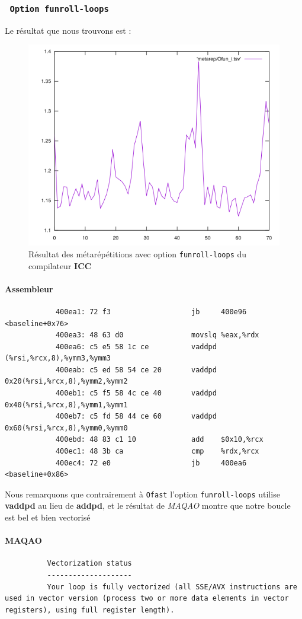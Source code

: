 \documentclass{report}
\begin{document}
      \subsubsection{\texttt{ Option funroll-loops}}
        Le résultat que nous trouvons est :
        \begin{figure}[ht!]
          \centering
          \includegraphics[scale=0.45]{resources/L1/metarep/Ofun_i.png}
          \caption{Résultat des métarépétitions avec option \texttt{funroll-loops} du compilateur \textbf{ICC}}
        \end{figure}
        \paragraph{Assembleur}
          \begin{verbatim}
            400ea1:	72 f3                	jb     400e96 <baseline+0x76>
            400ea3:	48 63 d0             	movslq %eax,%rdx
            400ea6:	c5 e5 58 1c ce       	vaddpd (%rsi,%rcx,8),%ymm3,%ymm3
            400eab:	c5 ed 58 54 ce 20    	vaddpd 0x20(%rsi,%rcx,8),%ymm2,%ymm2
            400eb1:	c5 f5 58 4c ce 40    	vaddpd 0x40(%rsi,%rcx,8),%ymm1,%ymm1
            400eb7:	c5 fd 58 44 ce 60    	vaddpd 0x60(%rsi,%rcx,8),%ymm0,%ymm0
            400ebd:	48 83 c1 10          	add    $0x10,%rcx
            400ec1:	48 3b ca             	cmp    %rdx,%rcx
            400ec4:	72 e0                	jb     400ea6 <baseline+0x86>
          \end{verbatim}
        Nous remarquons que contrairement à \texttt{Ofast} l'option \texttt{funroll-loops} utilise \textbf{vaddpd}
        au lieu de \textbf{addpd}, et le résultat de \textit{MAQAO} montre que notre boucle est bel et bien vectorisé
       \paragraph{MAQAO}
        \begin{verbatim}
          Vectorization status
          --------------------
          Your loop is fully vectorized (all SSE/AVX instructions are used in vector version (process two or more data elements in vector registers), using full register length).
        \end{verbatim}
\end{document}
